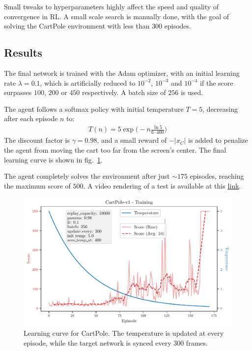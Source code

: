 \documentclass[11pt,a4paper]{scrartcl}
\begin{document}
Small tweaks to hyperparameters highly affect the speed and quality of convergence in RL. A small scale search is manually done, with the goal of solving the CartPole environment with less than $300$ episodes. 

\subsection{Results}
The final network is trained with the Adam optimizer, with an initial learning rate $\lambda= 0.1$, which is artificially reduced to $10^{-2}$, $10^{-3}$ and $10^{-4}$ if the score surpasses $100$, $200$ or $450$ respectively. A batch size of $256$ is used.

The agent follows a softmax policy with initial temperature $T=5$, decreasing after each episode $n$ to:
\begin{align*}
    T(n) = 5 \exp\Big(-n \frac{\ln 5}{6 \cdot 400}  \Big)
\end{align*}
The discount factor is $\gamma = 0.98$, and a small reward of $-|x_C|$ is added to penalize the agent from moving the cart too far from the screen's center. The final learning curve is shown in fig.~\ref{fig:cartpole_lr}. 

The agent completely solves the environment after just $\sim 175$ episodes, reaching the maximum score of $500$. A video rendering of a test is available at this \href{https://github.com/Einlar/DLNN_Assignments/tree/main/3/Code/video/01_CartPole_solved}{link}.

\begin{figure}[H]
    \centering
    \includegraphics[width=\textwidth]{../Code/Plots/1/24_06_21-00h43m46_best1}
    \caption{Learning curve for CartPole. The temperature is updated at every episode, while the target network is synced every $300$ frames. \label{fig:cartpole_lr}}
\end{figure}
\end{document}
